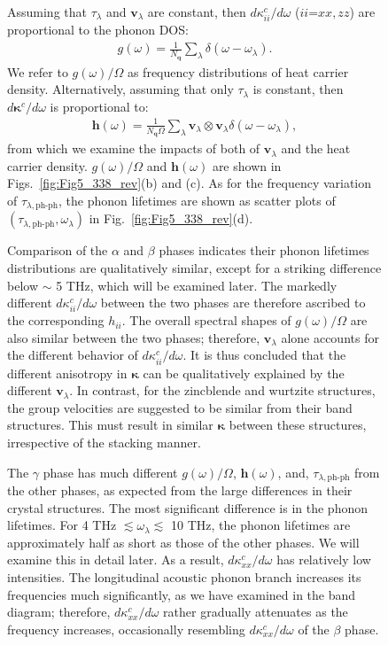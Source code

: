 \documentclass[twocolumn,amsmath,amssymb,a4paper,prb,superscriptaddress,floatfix]{revtex4-1}
\begin{document}
\begin{figure}[h]
Assuming that $\tau_\lambda$ and $\mathbf{v}_\lambda$ are constant, then
$d\kappa_{ii}^c/d\omega$ ($ii$=$xx,zz$) are proportional to the phonon
DOS: 
\begin{align}
 \label{eq:dos}
 g(\omega) = \frac{1}{N_\mathbf{q}}
 \sum_\lambda
 \delta(\omega-\omega_{\lambda}).
\end{align}
We refer to $g(\omega)/\Omega$ as frequency distributions of heat
carrier density. Alternatively, assuming that only $\tau_\lambda$ is constant,
then $d\boldsymbol{\kappa}^c/d\omega$ is proportional to:
\begin{align}
 \label{eq:wdos}
 \boldsymbol{h}(\omega) = \frac{1}{N_\mathbf{q}\Omega}
 \sum_\lambda
 \mathbf{v}_\lambda \otimes \mathbf{v}_\lambda
 \delta(\omega-\omega_{\lambda}),
\end{align}
from which we examine the impacts of both of $\mathbf{v}_\lambda$ and the heat carrier
density. $g(\omega)/\Omega$ and  $\boldsymbol{h}(\omega)$
are shown in
Figs.~\ref{fig:Fig5_338_rev}(b) and (c). As for the frequency
variation of $\tau_{\lambda,\text{ph-ph}}$, the phonon lifetimes are shown as scatter
plots of $(\tau_{\lambda,\text{ph-ph}},\omega_\lambda)$ in Fig.~\ref{fig:Fig5_338_rev}(d).

Comparison of the $\alpha$ and $\beta$ phases indicates their phonon lifetimes
distributions are qualitatively similar, except for a striking difference below
$\sim$ 5 THz, which will be examined later. The markedly different
$d\kappa_{ii}^c/d\omega$ between the two phases are therefore ascribed to the
corresponding $h_{ii}$. The overall spectral shapes of $g(\omega)/\Omega$ are also
similar between the two phases; therefore, $\mathbf{v}_\lambda$ alone accounts
for the different behavior of $d\kappa_{ii}^c/d\omega$. It is thus concluded
that the different anisotropy in $\boldsymbol{\kappa}$ can be qualitatively
explained by the different $\mathbf{v}_\lambda$.
In contrast, for the zincblende and wurtzite
structures, the group velocities are suggested to be similar from their band
structures\cite{phono3py}.
This must result in similar $\boldsymbol{\kappa}$ between these
structures, irrespective of the stacking manner. 

The $\gamma$ phase has much different $g(\omega)/\Omega$, $\boldsymbol{h}(\omega)$,
and, $\tau_{\lambda,\text{ph-ph}}$ from the other phases, as expected from the
large differences in their crystal structures. The most significant difference
is in the phonon lifetimes. For 4 THz $\lesssim\omega_\lambda\lesssim$ 10 THz,
the phonon lifetimes are approximately half as short as those of the other
phases. We will examine this in detail later. As a result,
$d\kappa_{xx}^c/d\omega$ has relatively low intensities. The longitudinal
acoustic phonon branch increases its frequencies much significantly, as we have
examined in the band diagram; therefore, $d\kappa_{xx}^c/d\omega$ rather
gradually attenuates as the frequency increases, occasionally resembling
$d\kappa_{xx}^c/d\omega$ of the $\beta$ phase.


\end{figure}
\end{document}
